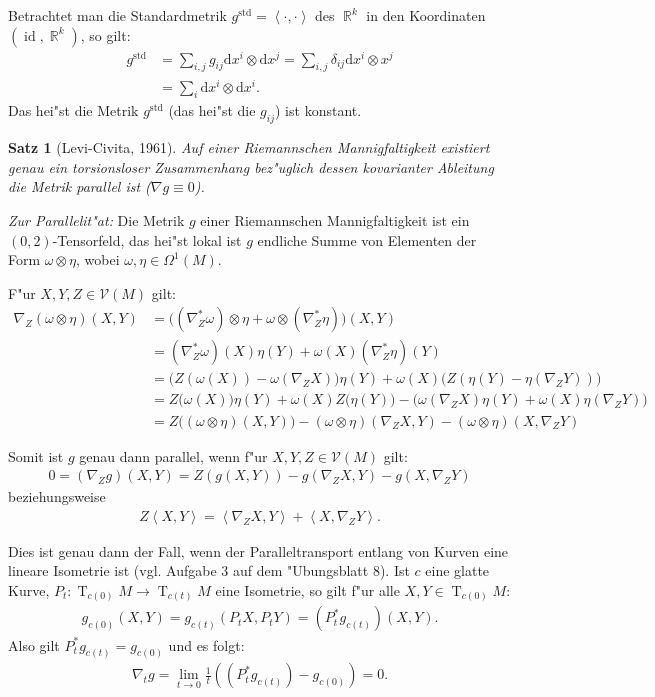 \documentclass[paper=A4, twoside, chapterprefix=true, bibliography=totoc, headsepline]{scrbook}
\DeclareMathOperator{\R}{\mathbb{R}}
\DeclareMathOperator{\Id}{id} %
\DeclareMathOperator{\T}{T} %
\newcommand{\dop}{\mathrm{d}}
\theoremstyle{plain}
\newtheorem{Satz}[Dfn]{Satz}
\theoremstyle{nonumberplain}
\theoremstyle{empty}
\theoremstyle{break}
\begin{document}
Betrachtet man die Standardmetrik $g^{\text{std}} = \left<\cdot,\cdot\right>$ des $\R^k$ in den Koordinaten $(\Id, \R^k)$, so gilt:
\begin{align*}
  g^{\text{std}} & = \sum_{i,j} g_{ij} \dop x^i \otimes \dop x^j = \sum_{i,j} \delta_{ij} \dop x^i \otimes x^j\\
  & = \sum_i \dop x^i \otimes \dop x^i.
\end{align*}
Das hei"st die Metrik $g^{\text{std}}$ (das hei"st die $g_{ij}$) ist konstant.

\begin{Satz}[Levi-Civita, 1961] \label{satz-7-12}
  Auf einer Riemannschen Mannigfaltigkeit existiert genau ein torsionsloser Zusammenhang bez"uglich dessen kovarianter Ableitung die Metrik parallel ist ($\nabla g \equiv 0$).
\end{Satz}

\emph{Zur Parallelit"at:} Die Metrik $g$ einer Riemannschen Mannigfaltigkeit ist ein $(0,2)$-Tensorfeld, das hei"st lokal ist $g$ endliche Summe von Elementen der Form $\omega \otimes \eta$, wobei $\omega, \eta \in \Omega^1(M)$.

F"ur $X,Y,Z \in \mathcal V(M)$ gilt:
\begin{align*}
  \nabla_Z(\omega \otimes \eta)(X,Y) & = \big((\nabla^{*}_Z\omega) \otimes \eta + \omega \otimes (\nabla^{*}_Z \eta)\big)(X,Y)\\
  & = (\nabla^{*}_Z \omega)(X)\eta(Y) + \omega(X)(\nabla^{*}_Z \eta)(Y)\\
  & = \big(Z(\omega(X)) - \omega(\nabla_ZX)\big)\eta(Y) + \omega(X)\big(Z(\eta(Y)-\eta(\nabla_ZY))\big)\\
  & = Z\big(\omega(X)\big)\eta(Y) + \omega(X)Z\big(\eta(Y)\big) - \big(\omega(\nabla_ZX)\eta(Y) + \omega(X)\eta(\nabla_ZY)\big)\\
  & = Z\big((\omega \otimes \eta)(X,Y)\big) - (\omega \otimes \eta)(\nabla_ZX,Y) - (\omega \otimes \eta)(X,\nabla_Z Y)
\end{align*}

Somit ist $g$ genau dann parallel, wenn f"ur $X,Y,Z \in \mathcal V(M)$ gilt:
\begin{align*}
  0 = (\nabla_Z g)(X,Y) = Z(g(X,Y)) - g(\nabla_ZX,Y) - g(X,\nabla_ZY)
\end{align*}
beziehungsweise
\begin{align*}
  Z\left<X,Y\right> = \left<\nabla_ZX,Y\right> + \left<X,\nabla_ZY\right>.
\end{align*}

Dies ist genau dann der Fall, wenn der Paralleltransport entlang von Kurven eine lineare Isometrie ist (vgl. Aufgabe 3 auf dem "Ubungsblatt 8).
Ist $c$ eine glatte Kurve, $P_t \colon \T_{c(0)}M \to \T_{c(t)}M$ eine Isometrie, so gilt f"ur alle $X,Y \in \T_{c(0)}M$: 
\begin{align*}
  g_{c(0)}(X,Y) = g_{c(t)}(P_tX,P_tY) = (P^{*}_tg_{c(t)})(X,Y).
\end{align*}
Also gilt $P_t^{*} g_{c(t)} = g_{c(0)}$ und es folgt:
\begin{align*}
  \nabla_t g = \lim_{t \to 0}\frac{1}{t} \left( (P_t^{*}g_{c(t)}) - g_{c(0)} \right) = 0.
\end{align*}
\end{document}
